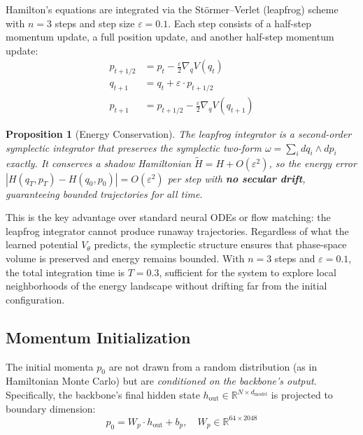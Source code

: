 \documentclass[11pt,a4paper,twocolumn]{article}
\newtheorem{proposition}{Proposition}
\begin{document}
Hamilton's equations are integrated via the St\"ormer--Verlet (leapfrog) scheme with $n = 3$ steps and step size $\varepsilon = 0.1$.
Each step consists of a half-step momentum update, a full position update, and another half-step momentum update:
\begin{align}
p_{t+1/2} &= p_t - \frac{\varepsilon}{2} \nabla_q V(q_t) \label{eq:leapfrog1} \\
q_{t+1} &= q_t + \varepsilon \cdot p_{t+1/2} \label{eq:leapfrog2} \\
p_{t+1} &= p_{t+1/2} - \frac{\varepsilon}{2} \nabla_q V(q_{t+1}) \label{eq:leapfrog3}
\end{align}

\begin{proposition}[Energy Conservation]
The leapfrog integrator is a second-order symplectic integrator that preserves the symplectic two-form $\omega = \sum_i dq_i \wedge dp_i$ exactly.
It conserves a shadow Hamiltonian $\tilde{H} = H + O(\varepsilon^2)$, so the energy error $|H(q_T, p_T) - H(q_0, p_0)| = O(\varepsilon^2)$ per step with \textbf{no secular drift}, guaranteeing bounded trajectories for all time.
\end{proposition}

This is the key advantage over standard neural ODEs or flow matching: the leapfrog integrator cannot produce runaway trajectories.
Regardless of what the learned potential $V_\theta$ predicts, the symplectic structure ensures that phase-space volume is preserved and energy remains bounded.
With $n = 3$ steps and $\varepsilon = 0.1$, the total integration time is $T = 0.3$, sufficient for the system to explore local neighborhoods of the energy landscape without drifting far from the initial configuration.

\subsection{Momentum Initialization}

The initial momenta $p_0$ are not drawn from a random distribution (as in Hamiltonian Monte Carlo) but are \emph{conditioned on the backbone's output}.
Specifically, the backbone's final hidden state $h_{\mathrm{out}} \in \mathbb{R}^{N \times d_{\mathrm{model}}}$ is projected to boundary dimension:
\begin{equation}
p_0 = W_p \cdot h_{\mathrm{out}} + b_p, \quad W_p \in \mathbb{R}^{64 \times 2048}
\label{eq:momentum_init}
\end{equation}
\end{document}
